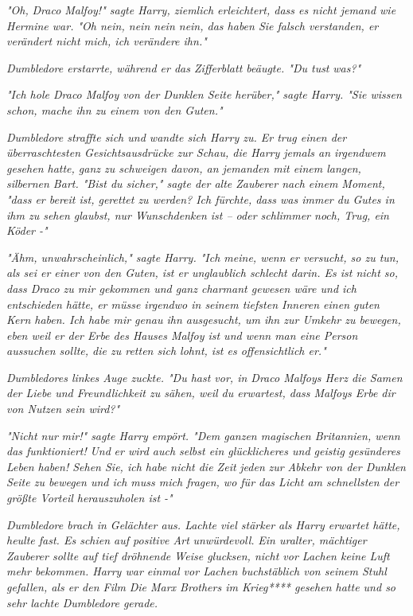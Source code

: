 {\emph{"Oh,} \emph{\emph{Draco Malfoy!}" sagte Harry, ziemlich erleichtert, dass es nicht jemand wie Hermine war. "Oh nein, nein nein nein, das haben Sie falsch verstanden, er verändert nicht mich, ich verändere ihn."}

\emph{Dumbledore erstarrte, während er das Zifferblatt beäugte. "Du tust} \emph{\emph{was?}"}

\emph{"Ich hole Draco Malfoy von der Dunklen Seite herüber," sagte Harry. "Sie wissen schon, mache ihn zu einem von den Guten."}

\emph{Dumbledore straffte sich und wandte sich Harry zu. Er trug einen der überraschtesten Gesichtsausdrücke zur Schau, die Harry jemals an irgendwem gesehen hatte, ganz zu schweigen davon, an jemanden mit einem langen, silbernen Bart. "Bist du sicher," sagte der alte Zauberer nach einem Moment, "dass er bereit ist, gerettet zu werden? Ich fürchte, dass was immer du Gutes in ihm zu sehen glaubst, nur Wunschdenken ist -- oder schlimmer noch, Trug, ein Köder -"}

\emph{"Ähm, unwahrscheinlich," sagte Harry. "Ich meine, wenn er versucht, so zu tun, als sei er einer von den Guten, ist er unglaublich schlecht darin. Es ist nicht so, dass Draco zu mir gekommen und ganz charmant gewesen wäre und ich entschieden hätte, er müsse irgendwo in seinem tiefsten Inneren einen guten Kern haben. Ich habe mir genau ihn ausgesucht, um ihn zur Umkehr zu bewegen, eben weil er der Erbe des Hauses Malfoy ist und wenn man eine Person aussuchen sollte, die zu retten sich lohnt, ist es offensichtlich er."}

\emph{Dumbledores linkes Auge zuckte. "Du hast vor, in Draco Malfoys Herz die Samen der Liebe und Freundlichkeit zu sähen, weil du erwartest, dass Malfoys Erbe dir von Nutzen sein wird?"}

\emph{"Nicht nur} \emph{\emph{mir!}" sagte Harry empört. "Dem ganzen magischen Britannien, wenn das funktioniert!} \emph{\emph{Und}} \emph{er wird auch selbst ein glücklicheres und geistig gesünderes Leben haben! Sehen Sie, ich habe nicht die Zeit} \emph{\emph{jeden}} \emph{zur Abkehr von der Dunklen Seite zu bewegen und ich muss mich fragen, wo für das Licht am schnellsten der größte Vorteil herauszuholen ist -"}

\emph{Dumbledore brach in Gelächter aus. Lachte viel stärker als Harry erwartet hätte, heulte fast. Es schien auf positive Art} \emph{\emph{unwürdevoll.}} \emph{Ein uralter, mächtiger Zauberer sollte auf tief dröhnende Weise glucksen, nicht vor Lachen keine Luft mehr bekommen. Harry war einmal vor Lachen buchstäblich von seinem Stuhl gefallen, als er den Film} \emph{\emph{Die Marx Brothers im Krieg}**** gesehen hatte und so sehr lachte Dumbledore gerade.}

}
